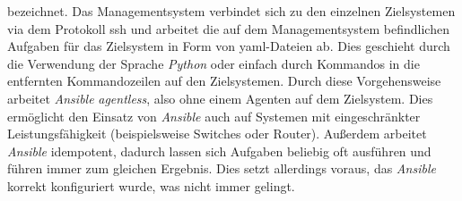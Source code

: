\documentclass[titlepage]{report}
\begin{document}
bezeichnet. Das Managementsystem verbindet sich zu den einzelnen
Zielsystemen via dem Protokoll \gls{ssh} und arbeitet die auf dem
Managementsystem befindlichen Aufgaben für das Zielsystem in Form von
\gls{yaml}\hyp{}Dateien ab. Dies geschieht durch
die Verwendung der Sprache \emph{Python} oder einfach durch Kommandos in
die entfernten Kommandozeilen auf den Zielsystemen. Durch
diese Vorgehensweise arbeitet \emph{Ansible} \emph{agentless}, also ohne
einem Agenten auf dem Zielsystem. Dies
ermöglicht den Einsatz von \emph{Ansible} auch auf Systemen mit
eingeschränkter Leistungsfähigkeit (beispielsweise Switches oder Router).
Außerdem arbeitet \emph{Ansible} idempotent, dadurch lassen sich
Aufgaben beliebig oft ausführen und führen immer zum gleichen Ergebnis.
Dies setzt allerdings voraus, das \emph{Ansible} korrekt konfiguriert
wurde, was nicht immer gelingt.
\end{document}
